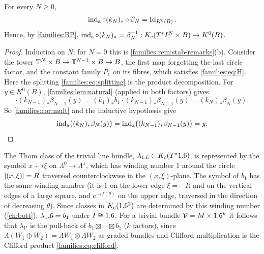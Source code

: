 \begin{proposition}[Normalization]\label{families:prop:normalization}
  For every $N\ge0$,
  \begin{equation*}
    \operatorname{ind}_{\mathrm{a}}\circ(k_N)_*\circ\beta_N=\operatorname{Id}_{K^0(B)}.
  \end{equation*}
  Hence, by \ref{families:BP}, $\operatorname{ind}_{\mathrm{a}}\circ(k_N)_*=\beta_N^{-1}:
  K_{\mathrm{c}}(T^*I^N\times B)\to K^0(B)$.
\end{proposition}
\begin{proof}
  Induction on $N$; for $N=0$ this is \cref{families:rem:stab-remarks}(b).
  Consider the tower $\mathbb{T}^N\times B\to\mathbb{T}^{N-1}\times B\to B$, the first
  map forgetting the last circle factor, and the constant family $P_1$ on its
  fibres, which satisfies \eqref{families:eq:H}. Here the splitting
  \eqref{families:eq:splitting} is the product decomposition. For
  $y\in K^0(B)$, \cref{families:lem:natural} (applied in both factors) gives
  \begin{equation*}
    [\sigma_0(P_1)]\cdot(k_{N-1})_*\beta_{N-1}(y)=(k_1)_*b_1\cdot(k_{N-1})_*
    \beta_{N-1}(y)=(k_N)_*\beta_N(y).
  \end{equation*}
  So \cref{families:cor:mult} and the inductive hypothesis give
  \begin{equation*}
    \operatorname{ind}_{\mathrm{a}}\bigl((k_N)_*\beta_N(y)\bigr)=\operatorname{ind}_{\mathrm{a}}\bigl((k_{N-1})_*\beta_{N-1}(y)
    \bigr)=y.
  \end{equation*}
\end{proof}

\begin{remark}\label{families:rem:bott-generator}
  The Thom class of the trivial line bundle, $\lambda_{1.6}\in K_{\mathrm{c}}(T^*1.6)$, is
  represented by the symbol $x+i\xi$ on $\Lambda^0\to\Lambda^1$, which has
  winding number $1$ around the circle $\lvert (x,\xi)\rvert=R$ traversed
  counterclockwise in the $(x,\xi)$-plane. The symbol of $b_1$ has the same
  winding number (it is $1$ on the lower edge $\xi=-R$ and on the vertical
  edges of a large square, and $e^{-if(\theta)}$ on the upper edge, traversed
  in the direction of decreasing $\theta$). Since classes in $K_{\mathrm{c}}(1.6^2)$ are
  determined by this winding number (\cref{ch:bott}), $\lambda_1.6=b_1$
  under $I\cong1.6$. For a trivial bundle $\mathcal V=M\times1.6^k$ it follows
  that $\lambda_{\mathcal V}$ is the pull-back of $b_1\boxtimes\cdots\boxtimes
  b_1$ ($k$ factors), since $\Lambda(W_1\oplus W_2)=\Lambda W_1\otimes\Lambda
  W_2$ as graded bundles and Clifford multiplication is the Clifford product
  \eqref{families:eq:clifford}.
\end{remark}

